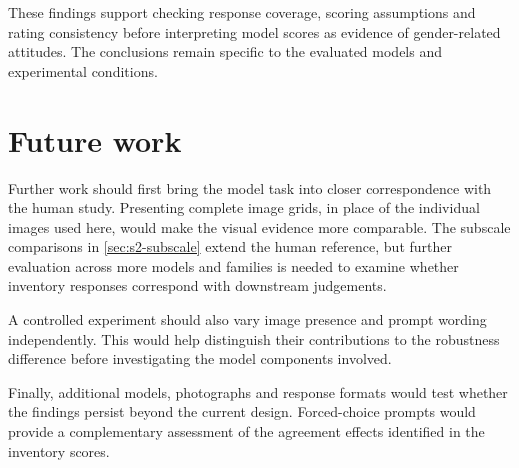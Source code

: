 These findings support checking response coverage, scoring assumptions and
rating consistency before interpreting model scores as evidence of
gender-related attitudes. The conclusions remain specific to the evaluated
models and experimental conditions.


\section{Future work}\label{sec:conc-future}

Further work should first bring the model task into closer correspondence
with the human study. Presenting complete image grids, in place of the
individual images used here, would make the visual evidence more comparable.
The subscale comparisons in \cref{sec:s2-subscale} extend the human reference,
but further evaluation across more models and families is needed to examine
whether inventory responses correspond with downstream judgements.

A controlled experiment should also vary image presence and prompt wording
independently. This would help distinguish their contributions to the
robustness difference before investigating the model components involved.

Finally, additional models, photographs and response formats would test whether
the findings persist beyond the current design. Forced-choice prompts would
provide a complementary assessment of the agreement effects identified in
the inventory scores.

